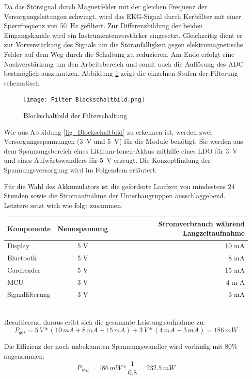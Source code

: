Da das Störsignal durch Magnetfelder mit der gleichen Frequenz der Versorgungsleitungen schwingt, wird das EKG-Signal durch Kerbfilter mit einer Sperrfrequenz von \SI{50}{\hertz} gefiltert. Zur Differenzbildung der beiden Eingangskanäle wird ein Instrumentenverstärker eingesetzt. Gleichzeitig dient er zur Vorverstärkung des Signals um die Störanfälligkeit gegen elektromagnetische Felder auf dem Weg durch die Schaltung zu reduzieren. Am Ende erfolgt eine Nachverstärkung um den Arbeitsbereich und somit auch die Auflösung des ADC bestmöglich auszunutzen. Abbildung \ref{fig_Blockschaltbild Filter} zeigt die einzelnen Stufen der Filterung schematisch.

\begin{figure} [!h]
	\texttt{[image: Filter Blockschaltbild.png]}
	\caption{Blockschaltbild der Filterschaltung}
	\label{fig_Blockschaltbild Filter} 
\end{figure}

Wie aus Abbildung \ref{fig_Blockschaltbild} zu erkennen ist, werden zwei Versorgungsspannungen (\SI{3}{\volt}  und \SI{5}{\volt}) für die Module benötigt. Sie werden aus dem Spannungsbereich eines Lithium-Ionen-Akkus mithilfe eines LDO für \SI{3}{\volt} und eines Aufwärtswandlers für \SI{5}{\volt} erzeugt. Die Konzeptfindung der Spannungsversorgung wird im Folgendem erläutert.

Für die Wahl des Akkumulators ist die geforderte Laufzeit von mindestens 24 Stunden sowie die Stromaufnahme der Unterbaugruppen ausschlaggebend. Letztere setzt wich wie folgt zusammen:\\

\begin{tabular}[h]{l|c|r}
Komponente & Nennspannung & Stromverbrauch während Langzeitaufnahme\\
\hline
Display & 5 V & 10 mA \\
Bluetooth & 5 V & 8 mA \\
Cardreader & 5 V & 15 mA \\
MCU & 3 V & 4 m A \\
Signalfilterung & 3 V & 3 mA \\
\end{tabular}\\

Resultierend daraus eribt sich die gesammte Leistungsaufnahme zu: 
$$ P_{ges} = 5\,V * (10\,mA + 8\,mA + 15\,mA) + 3\,V * (4\, mA + 3 \,mA) = 186\, mW $$

Die Effizienz der noch unbekannten Spannungswandler wird vorläufig mit 80\% angenommen:
$$ P_{Bat} = 186\,mW * \frac{1}{0.8} = 232.5\,mW $$

